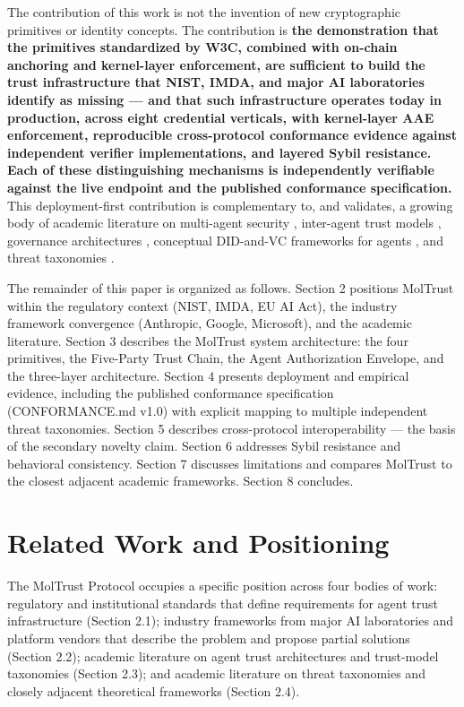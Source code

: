 The contribution of this work is not the invention of new cryptographic primitives or identity concepts. The contribution is \textbf{the demonstration that the primitives standardized by W3C, combined with on-chain anchoring and kernel-layer enforcement, are sufficient to build the trust infrastructure that NIST, IMDA, and major AI laboratories identify as missing — and that such infrastructure operates today in production, across eight credential verticals, with kernel-layer AAE enforcement, reproducible cross-protocol conformance evidence against independent verifier implementations, and layered Sybil resistance. Each of these distinguishing mechanisms is independently verifiable against the live endpoint and the published conformance specification.} This deployment-first contribution is complementary to, and validates, a growing body of academic literature on multi-agent security \cite{ref14_schroederdewitt}, inter-agent trust models \cite{ref15_hurong}, governance architectures \cite{ref16_syros,ref17_acharya}, conceptual DID-and-VC frameworks for agents \cite{ref36_rodriguezgarzon}, and threat taxonomies \cite{ref18_ferrag,ref19_owasp,ref20_mao}.


The remainder of this paper is organized as follows. Section 2 positions MolTrust within the regulatory context (NIST, IMDA, EU AI Act), the industry framework convergence (Anthropic, Google, Microsoft), and the academic literature. Section 3 describes the MolTrust system architecture: the four primitives, the Five-Party Trust Chain, the Agent Authorization Envelope, and the three-layer architecture. Section 4 presents deployment and empirical evidence, including the published conformance specification (CONFORMANCE.md v1.0) with explicit mapping to multiple independent threat taxonomies. Section 5 describes cross-protocol interoperability — the basis of the secondary novelty claim. Section 6 addresses Sybil resistance and behavioral consistency. Section 7 discusses limitations and compares MolTrust to the closest adjacent academic frameworks. Section 8 concludes.



\section{Related Work and Positioning}

The MolTrust Protocol occupies a specific position across four bodies of work: regulatory and institutional standards that define requirements for agent trust infrastructure (Section 2.1); industry frameworks from major AI laboratories and platform vendors that describe the problem and propose partial solutions (Section 2.2); academic literature on agent trust architectures and trust-model taxonomies (Section 2.3); and academic literature on threat taxonomies and closely adjacent theoretical frameworks (Section 2.4).


